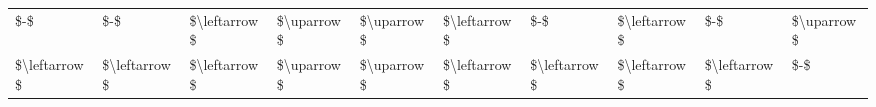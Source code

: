 \begin{tabular}{llllllllll}
         \$-\$ &          \$-\$ & \$\textbackslash leftarrow\$ & \$\textbackslash uparrow\$ & \$\textbackslash uparrow\$ & \$\textbackslash leftarrow\$ &          \$-\$ & \$\textbackslash leftarrow\$ &          \$-\$ &   \$\textbackslash uparrow\$ \\
\$\textbackslash leftarrow\$ & \$\textbackslash leftarrow\$ & \$\textbackslash leftarrow\$ & \$\textbackslash uparrow\$ & \$\textbackslash uparrow\$ & \$\textbackslash leftarrow\$ & \$\textbackslash leftarrow\$ & \$\textbackslash leftarrow\$ & \$\textbackslash leftarrow\$ &          \$-\$ \\
\bottomrule
\end{tabular}
